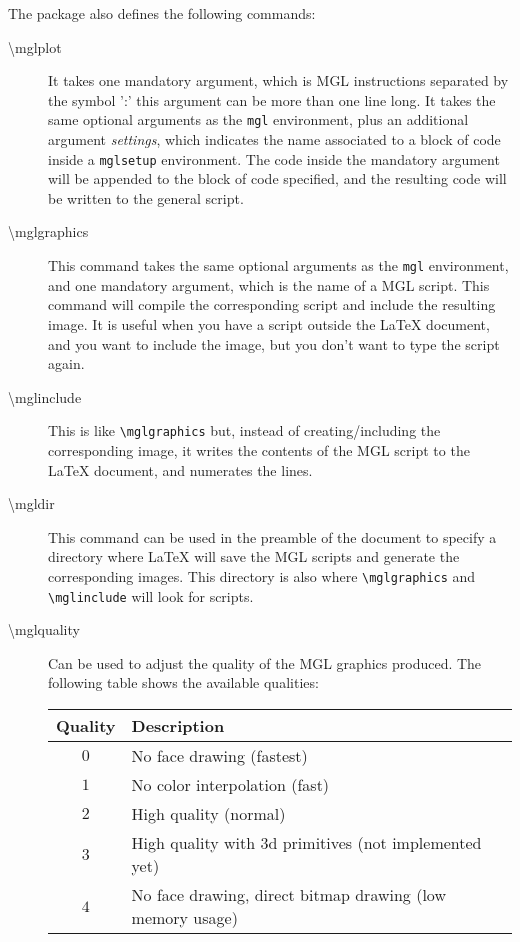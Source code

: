\documentclass{article}
\begin{document}
The package also defines the following commands:
\begin{description}
\item[\textbackslash{}mglplot]
	It takes one mandatory argument, which is MGL instructions separated by the symbol ':' this argument can be more than one line long. It takes the same optional arguments as the \texttt{mgl} environment, plus an additional argument \emph{settings}, which indicates the name associated to a block of code inside a \texttt{mglsetup} environment. The code inside the mandatory argument will be appended to the block of code specified, and the resulting code will be written to the general script.
\item[\textbackslash{}mglgraphics]
	This command takes the same optional arguments as the \texttt{mgl} environment, and one mandatory argument, which is the name of a MGL script. This command will compile the corresponding script and include the resulting image. It is useful when you have a script outside the LaTeX document, and you want to include the image, but you don't want to type the script again.
\item[\textbackslash{}mglinclude]
	This is like \texttt{\textbackslash{}mglgraphics} but, instead of creating/including the corresponding image, it writes the contents of the MGL script to the LaTeX document, and numerates the lines.
\item[\textbackslash{}mgldir]
	This command can be used in the preamble of the document to specify a directory where LaTeX will save the MGL scripts and generate the corresponding images. This directory is also where \texttt{\textbackslash{}mglgraphics} and \texttt{\textbackslash{}mglinclude} will look for scripts.
\item[\textbackslash{}mglquality]
  Can be used to adjust the quality of the MGL graphics produced. The following table shows the available qualities:
  \begin{center}
    \begin{tabular}{cl}
      \hline
      Quality & Description\\
      \hline
      \hline
      $0$ & No face drawing (fastest)\\
      \hline
      $1$ & No color interpolation (fast)\\
      \hline
      $2$ & High quality (normal)\\
      \hline
      $3$ & High quality with 3d primitives (not implemented yet)\\
      \hline
      $4$ & No face drawing, direct bitmap drawing (low memory usage)\\

\end{tabular}
\end{center}
\end{description}
\end{document}

